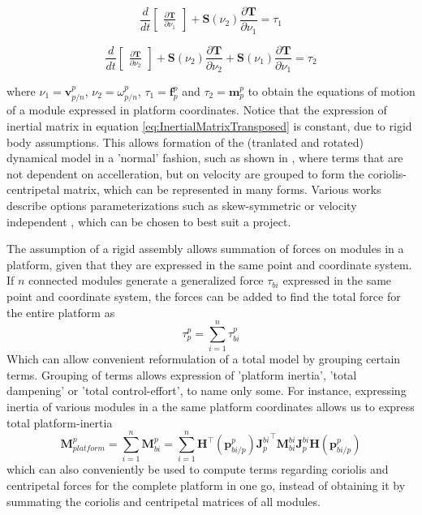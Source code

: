 \begin{equation} 
	\frac{d}{dt} \begin{bmatrix}\frac{\partial \textbf{T}}{\partial \nu_{1}}\end{bmatrix} + \textbf{S}(\nu_{2})\frac{\partial \textbf{T}}{\partial \nu_{1}} = \tau_{1}
\end{equation}

\begin{equation} 
\frac{d}{dt} \begin{bmatrix}\frac{\partial \textbf{T}}{\partial \nu_{2}}\end{bmatrix} + \textbf{S}(\nu_{2})\frac{\partial \textbf{T}}{\partial \nu_{2}}+ \textbf{S}(\nu_{1})\frac{\partial \textbf{T}}{\partial \nu_{1}} = \tau_{2}
\end{equation}

where $\nu_{1} = \textbf{v}_{p/n}^{p}$, $\nu_{2} = \omega_{p/n}^{p}$, $\tau_{1} = \textbf{f}_{p}^{p}$ and  $\tau_{2} = \textbf{m}_{p}^{p}$ to obtain the equations of motion of a module expressed in platform coordinates. Notice that the expression of inertial matrix in equation \ref{eq:InertialMatrixTransposed} is constant, due to rigid body assumptions. This allows formation of the (tranlated and rotated) dynamical model in a 'normal' fashion, such as shown in \citet{fossen2011handbook}, where terms that are not dependent on accelleration, but on velocity are grouped to form the coriolis-centripetal matrix, which can be represented in many forms. Various works describe options parameterizations such as skew-symmetric \citet{SagatunFossen1991} or velocity independent \citet{fossenFjellstad1995}, which can be chosen to best suit a project.

The assumption of a rigid assembly allows summation of forces on modules in a platform, given that they are expressed in the same point and coordinate system. If $n$ connected modules generate a generalized force $\tau_{bi}$ expressed in the same point and coordinate system, the forces can be added to find the total force for the entire platform as
\begin{equation} 
\tau_{p}^{p} = \sum_{i =1}^{n} \tau_{bi}^{p}
\end{equation}
Which can allow convenient reformulation of a total model by grouping certain terms. Grouping of terms allows expression of 'platform inertia', 'total dampening' or 'total control-effort', to name only some. For instance, expressing inertia of various modules in a the same platform coordinates allows us to express total platform-inertia
\begin{equation}
	\textbf{M}_{platform}^{p} = \sum_{i=1}^{n} \textbf{M}_{bi}^{p} = \sum_{i=1}^{n} \textbf{H}^{\top}(\textbf{p}_{bi/p}^{p}){\textbf{J}_{p}^{bi}}^{\top}  \textbf{M}_{bi}^{bi} \textbf{J}_{p}^{bi} \textbf{H}(\textbf{p}_{bi/p}^{p})
	\label{totalInertiaSummed}
\end{equation}
which can also conveniently be used to compute terms regarding coriolis and centripetal forces for the complete platform in one go, instead of obtaining it by summating the coriolis and centripetal matrices of all modules. 


